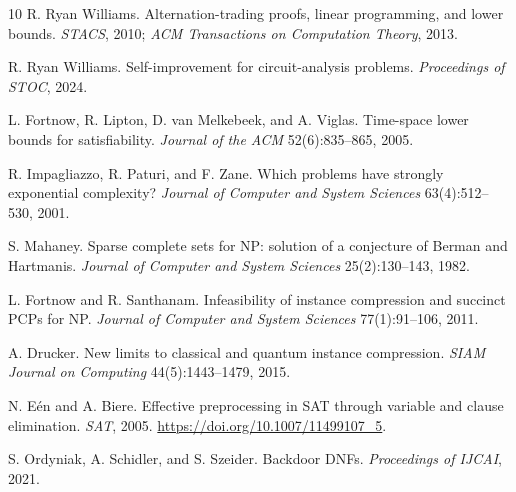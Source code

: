 \documentclass[10pt]{article}
\begin{document}
\begin{thebibliography}{10}
R. Ryan Williams.
\newblock Alternation-trading proofs, linear programming, and lower bounds.
\newblock \emph{STACS}, 2010; \emph{ACM Transactions on Computation Theory}, 2013.

R. Ryan Williams.
\newblock Self-improvement for circuit-analysis problems.
\newblock \emph{Proceedings of STOC}, 2024.

L. Fortnow, R. Lipton, D. van Melkebeek, and A. Viglas.
\newblock Time-space lower bounds for satisfiability.
\newblock \emph{Journal of the ACM} 52(6):835--865, 2005.

R. Impagliazzo, R. Paturi, and F. Zane.
\newblock Which problems have strongly exponential complexity?
\newblock \emph{Journal of Computer and System Sciences} 63(4):512--530, 2001.

S. Mahaney.
\newblock Sparse complete sets for NP: solution of a conjecture of Berman and Hartmanis.
\newblock \emph{Journal of Computer and System Sciences} 25(2):130--143, 1982.

L. Fortnow and R. Santhanam.
\newblock Infeasibility of instance compression and succinct PCPs for NP.
\newblock \emph{Journal of Computer and System Sciences} 77(1):91--106, 2011.

A. Drucker.
\newblock New limits to classical and quantum instance compression.
\newblock \emph{SIAM Journal on Computing} 44(5):1443--1479, 2015.

N. E\'en and A. Biere.
\newblock Effective preprocessing in SAT through variable and clause elimination.
\newblock \emph{SAT}, 2005. \url{https://doi.org/10.1007/11499107_5}.

S. Ordyniak, A. Schidler, and S. Szeider.
\newblock Backdoor DNFs.
\newblock \emph{Proceedings of IJCAI}, 2021.
\end{thebibliography}

\end{document}
